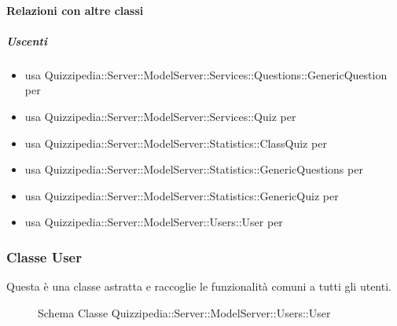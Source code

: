 \paragraph{Relazioni con altre classi}
\subparagraph{Uscenti}
\begin{itemize}
\item usa Quizzipedia::Server::ModelServer::Services::Questions::GenericQuestion per 
\item usa Quizzipedia::Server::ModelServer::Services::Quiz per 
\item usa Quizzipedia::Server::ModelServer::Statistics::ClassQuiz per 
\item usa Quizzipedia::Server::ModelServer::Statistics::GenericQuestions per 
\item usa Quizzipedia::Server::ModelServer::Statistics::GenericQuiz per 
\item usa Quizzipedia::Server::ModelServer::Users::User per 
\end{itemize}
\subsubsection{Classe User}
Questa è una classe astratta e raccoglie le funzionalità comuni a tutti gli utenti.
\begin{figure}[H]
\centering
\noindent{}
\caption[Schema Classe User]{Schema Classe Quizzipedia::Server::ModelServer::Users::User}
\end{figure}
